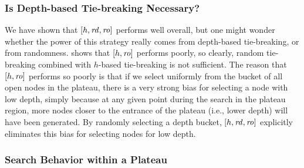 
\subsubsection{Is Depth-based Tie-breaking Necessary?}

We have shown that $[h,\mbox{\textit{rd}},\mbox{\textit{ro}}]$ performs well overall, but
one might wonder whether the power of this strategy really comes from depth-based tie-breaking, or from randomness.
 shows that $[h,\mbox{\textit{ro}}]$ performs poorly, so clearly, random tie-breaking combined with $h$-based tie-breaking is not sufficient.
The reason that $[h,\mbox{\textit{ro}}]$ performs so poorly is that if we select uniformly from the bucket of all open nodes in the plateau, there is a very strong bias for selecting a node with low depth, simply because at any given point during the search in the plateau region, more nodes closer to the entrance of the plateau (i.e., lower depth) will have been generated.
By randomly selecting a depth bucket, $[h,\mbox{\textit{rd}},\mbox{\textit{ro}}]$ explicitly eliminates this bias for selecting nodes for low depth.



\subsubsection{Search Behavior within a Plateau}

